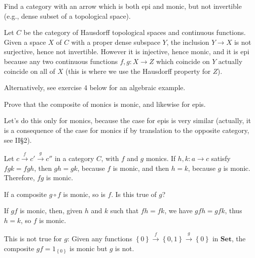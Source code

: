 \begin{exercise}
Find a category with an arrow which is both epi and monic, but not invertible (e.g., dense subset of a topological space).
\end{exercise}
\begin{solution}
Let $C$ be the category of Hausdorff topological spaces and continuous functions. Given a space $X$ of $C$ with a proper dense subspace $Y$, the inclusion $Y\to X$ is not surjective, hence not invertible. However it is injective, hence monic, and it is epi because any two continuous functions $f,g\colon X\to Z$ which coincide on $Y$ actually coincide on all of $X$ (this is where we use the Hausdorff property for $Z$).

Alternatively, see exercise 4 below for an algebraic example.
\end{solution}

\begin{exercise}
Prove that the composite of monics is monic, and likewise for epis.
\end{exercise}
\begin{solution}
Let's do this only for monics, because the case for epis is very similar (actually, it is a consequence of the case for monics if by translation to the opposite category, see II\S 2).

Let $c\overset{f}{\to}c'\overset{g}{\to}c''$ in a category $C$, with $f$ and $g$ monics. If $h,k:a\to c$ satisfy $fgk=fgh$, then $gh=gk$, because $f$ is monic, and then $h=k$, because $g$ is monic. Therefore, $fg$ is monic.
\end{solution}

\begin{exercise}
If a composite $g\circ f$ is monic, so is $f$. Is this true of $g$?
\end{exercise}
\begin{solution}
If $gf$ is monic, then, given $h$ and $k$ such that $fh=fk$, we have $gfh=gfk$, thus $h=k$, so $f$ is monic.

This is not true for $g$: Given any functions $\left\{0\right\}\overset{f}{\to}\left\{0,1\right\}\overset{g}{\to}\left\{0\right\}$ in $\mathbf{Set}$, the composite $gf=1_{\left\{0\right\}}$ is monic but $g$ is not.
\end{solution}

